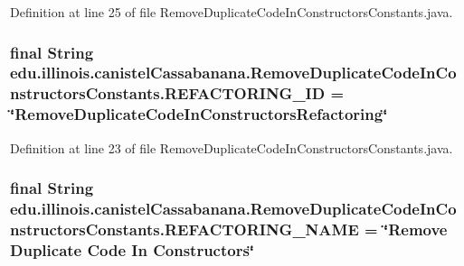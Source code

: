 Definition at line 25 of file RemoveDuplicateCodeInConstructorsConstants.java.

\hypertarget{classedu_1_1illinois_1_1canistelCassabanana_1_1RemoveDuplicateCodeInConstructorsConstants_a9ec775251440faa08c5106486ba0cfee}{
\subsubsection[{REFACTORING\_\-ID}]{\setlength{\rightskip}{0pt plus 5cm}final String {\bf edu.illinois.canistelCassabanana.RemoveDuplicateCodeInConstructorsConstants.REFACTORING\_\-ID} = \char`\"{}RemoveDuplicateCodeInConstructorsRefactoring\char`\"{}}}
\label{classedu_1_1illinois_1_1canistelCassabanana_1_1RemoveDuplicateCodeInConstructorsConstants_a9ec775251440faa08c5106486ba0cfee}


Definition at line 23 of file RemoveDuplicateCodeInConstructorsConstants.java.

\hypertarget{classedu_1_1illinois_1_1canistelCassabanana_1_1RemoveDuplicateCodeInConstructorsConstants_a6731b6d50436db4f3f9a0ecb1ba760fe}{
\subsubsection[{REFACTORING\_\-NAME}]{\setlength{\rightskip}{0pt plus 5cm}final String {\bf edu.illinois.canistelCassabanana.RemoveDuplicateCodeInConstructorsConstants.REFACTORING\_\-NAME} = \char`\"{}Remove Duplicate Code In Constructors\char`\"{}}}
\label{classedu_1_1illinois_1_1canistelCassabanana_1_1RemoveDuplicateCodeInConstructorsConstants_a6731b6d50436db4f3f9a0ecb1ba760fe}


